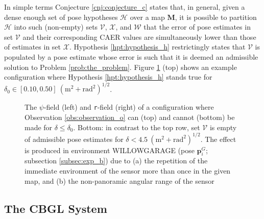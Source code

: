 In simple terms Conjecture \ref{cnj:conjecture_c} states that, in general,
given a dense enough set of pose hypotheses $\mathcal{H}$ over a map $\bm{M}$,
it is possible to partition $\mathcal{H}$ into such (non-empty) sets
$\mathcal{V}$, $\mathcal{X}$, and $\mathcal{W}$ that the error of pose
estimates in set $\mathcal{V}$ and their corresponding CAER values are
simultaneously lower than those of estimates in set $\mathcal{X}$. Hypothesis
\ref{hpt:hypothesis_h} restrictingly states that $\mathcal{V}$ is populated by
a pose estimate whose error is such that it is deemed an admissible solution to
Problem \ref{prob:the_problem}. Figure \ref{fig:h_and_h_not_fig} (top) shows
an example configuration where Hypothesis \ref{hpt:hypothesis_h}
stands true for $ \delta_0 \in [0.10, 0.50] \ (\text{m}^2 + \text{rad}^2)^{1/2}$.

\begin{figure}\hspace{0.5cm}
  
  \vspace{0.7cm}
  \caption{\small The $\psi$-field (left) and \texttt{r}-field (right) of a
           configuration where Observation \ref{obs:observation_o} can (top)
           and cannot (bottom) be made for $\delta \leq \delta_0$. Bottom:
           in contrast to the top row, set $\mathcal{V}$ is empty of admissible
           pose estimates for $\delta < 4.5 \ (\text{m}^2 +
           \text{rad}^2)^{1/2}$. The effect is produced in environment
           WILLOWGARAGE (pose $\bm{p}_{i}^G$; subsection \ref{subsec:exp_b})
           due to (a) the repetition of the immediate environment of the sensor
           more than once in the given map, and (b) the non-panoramic angular
           range of the sensor}
  \vspace{-0.5cm}
  \label{fig:h_and_h_not_fig}
\end{figure}


\subsection{The CBGL System}

